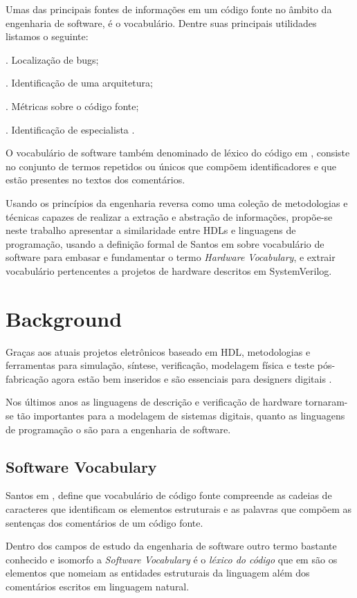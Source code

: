 \documentclass[12pt, twocolumn, a4paper]{article}
\begin{document}
Umas das principais fontes de informações em um código fonte no âmbito da engenharia de software, é o vocabulário. Dentre suas principais utilidades listamos o seguinte:

. Localização de bugs;

. Identificação de uma arquitetura;

. Métricas sobre o código fonte;

. Identificação de especialista \cite{Santos2015}.

O vocabulário de software também denominado de léxico do código em \cite{Biggers2011}, consiste no conjunto de termos repetidos ou únicos que compõem identificadores e que estão presentes no textos dos comentários\cite{Abebe2009}.

Usando os princípios da engenharia reversa como uma coleção de metodologias e técnicas capazes de realizar a extração e abstração de informações\cite{Santos2009}, propõe-se neste trabalho apresentar a similaridade entre HDLs e linguagens de programação, usando a definição formal de Santos em \cite{Santos2015} sobre vocabulário de software para embasar e fundamentar o termo \textit{Hardware Vocabulary}, e extrair vocabulário pertencentes a projetos de hardware descritos em SystemVerilog. 

	\section{Background}
\quad Graças aos atuais projetos eletrônicos baseado em HDL, metodologias e ferramentas para simulação, síntese, verificação, modelagem física e teste pós-fabricação agora estão bem inseridos e são essenciais para designers digitais \cite{Navabi2015}. 

Nos últimos anos as linguagens de descrição e verificação de hardware tornaram-se tão importantes para a modelagem de sistemas digitais, quanto as linguagens de programação o são para a engenharia de software. 
	
	\subsection{Software Vocabulary}
\quad Santos em \cite{Santos2009}, define que vocabulário de código fonte compreende as cadeias de caracteres que identificam os elementos estruturais e as palavras que compõem as sentenças dos comentários de um código fonte. 

Dentro dos campos de estudo da engenharia de software outro termo bastante conhecido e isomorfo a \textit{Software Vocabulary} é o \textit{léxico do código} que em \cite{Biggers2011} são os elementos que nomeiam as entidades estruturais da linguagem além dos comentários escritos em linguagem natural.
\end{document}
